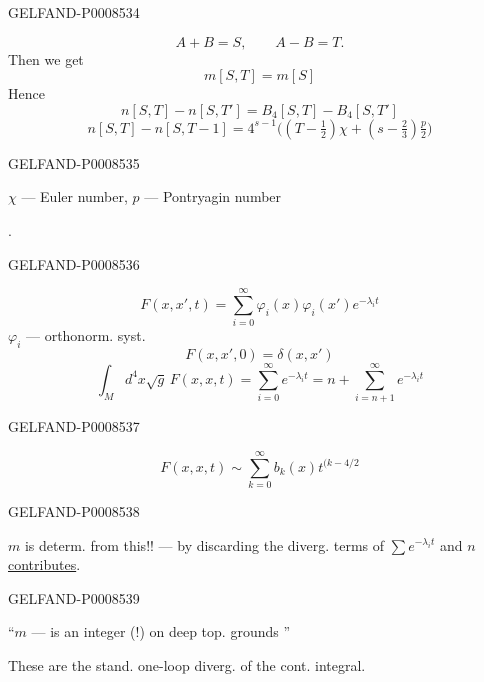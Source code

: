 \begin{GelfandAdjacentEvidence}{GELFAND-P000853}{4}

\[
A+B=S,\qquad A-B=T.
\]
Then we get
\[
m[S,T]=m[S]\tag{37}
\]
Hence
\[
n[S,T]-n[S,T']=B_4[S,T]-B_4[S,T']\tag{38}
\]
\[
n[S,T]-n[S,T-1]=4^{s-1}\bigl((T-\tfrac12)\chi+(s-\tfrac23)\tfrac{p}{2}\bigr)\tag{39}
\]
\end{GelfandAdjacentEvidence}
\begin{GelfandAdjacentEvidence}{GELFAND-P000853}{5}


\(\chi\) — Euler number, \(p\) — Pontryagin number

.
\end{GelfandAdjacentEvidence}
\begin{GelfandAdjacentEvidence}{GELFAND-P000853}{6}

\[
F(x,x',t)=\sum_{i=0}^{\infty}\varphi_i(x)\varphi_i(x')e^{-\lambda_i t}\tag{40}
\]
\(\varphi_i\) — orthonorm. syst.
\[
F(x,x',0)=\delta(x,x')\tag{41}
\]
\[
\int_M d^4x\sqrt{g}\,F(x,x,t)
=\sum_{i=0}^{\infty}e^{-\lambda_i t}
=n+\sum_{i=n+1}^{\infty}e^{-\lambda_i t}\tag{42}
\]
\end{GelfandAdjacentEvidence}
\begin{GelfandAdjacentEvidence}{GELFAND-P000853}{7}

\[
F(x,x,t)\sim\sum_{k=0}^{\infty}b_k(x)t^{(k-4/2}\tag{43}
\]
\end{GelfandAdjacentEvidence}
\begin{GelfandAdjacentEvidence}{GELFAND-P000853}{8}


\(m\) is determ. from this!! — by discarding the diverg. terms of \(\sum e^{-\lambda_i t}\) and \(n\) \uline{contributes}.

\end{GelfandAdjacentEvidence}
\begin{GelfandAdjacentEvidence}{GELFAND-P000853}{9}


“\(m\) — is an integer (!) on deep top. grounds ”

These are the stand. one-loop diverg. of the cont. integral.
\end{GelfandAdjacentEvidence}
